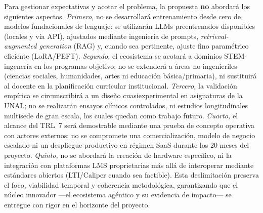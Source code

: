 Para gestionar expectativas y acotar el problema, la propuesta \textbf{no} abordará los siguientes aspectos. \emph{Primero,} no se desarrollará entrenamiento desde cero de modelos fundacionales de lenguaje: se utilizarán LLMs preentrenados disponibles (locales y vía API), ajustados mediante ingeniería de prompts, \emph{retrieval-augmented generation} (RAG) y, cuando sea pertinente, ajuste fino paramétrico eficiente (LoRA/PEFT). \emph{Segundo,} el ecosistema se acotará a dominios STEM-ingenería en los programas objetivo; no se extenderá a áreas no ingenieriles (ciencias sociales, humanidades, artes ni educación básica/primaria), ni sustituirá al docente en la planificación curricular institucional. \emph{Tercero,} la validación empírica se circunscribirá a un diseño cuasiexperimental en asignaturas de la UNAL; no se realizarán ensayos clínicos controlados, ni estudios longitudinales multisede de gran escala, los cuales quedan como trabajo futuro. \emph{Cuarto,} el alcance del TRL~7 será demostrable mediante una prueba de concepto operativa con actores externos; no se compromete una comercialización, modelo de negocio escalado ni un despliegue productivo en régimen SaaS durante los 20 meses del proyecto. \emph{Quinto,} no se abordará la creación de hardware específico, ni la integración con plataformas LMS proprietarias más allá de interoperar mediante estándares abiertos (LTI/Caliper cuando sea factible). Esta deslimitación preserva el foco, viabilidad temporal y coherencia metodológica, garantizando que el núcleo innovador —el ecosistema agéntico y su evidencia de impacto— se entregue con rigor en el horizonte del proyecto.